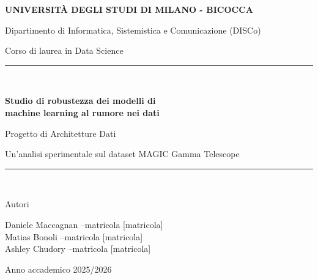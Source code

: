 \documentclass[12pt,a4paper]{article}
\begin{document}
\begin{titlepage}
	\centering
	\vspace*{0.6cm}
	{\Large\bfseries UNIVERSIT\`A DEGLI STUDI DI MILANO - BICOCCA\par}
	\vspace{0.4cm}
	{\large Dipartimento di Informatica, Sistemistica e Comunicazione (DISCo)\par}
	\vspace{0.2cm}
	{\large Corso di laurea in Data Science\par}
	\vspace{1.2cm}

	\rule{\textwidth}{0.4pt}\\[0.4cm]
	{\LARGE\bfseries Studio di robustezza dei modelli di\\ machine learning al rumore nei dati\par}
	\vspace{0.35cm}
	{\large Progetto di Architetture Dati\par}
	\vspace{0.25cm}
	{\normalsize Un'analisi sperimentale sul dataset MAGIC Gamma Telescope\par}
	\rule{\textwidth}{0.4pt}\\[1.4cm]

	\begin{minipage}{0.9\textwidth}
		\centering
		{\large Autori\par}
		\vspace{0.3cm}
		{\large
			Daniele Maccagnan \quad--\quad matricola [matricola]\\[0.25cm]
			Matias Bonoli \quad--\quad matricola [matricola]\\[0.25cm]
			Ashley Chudory \quad--\quad matricola [matricola]\\
		}
	\end{minipage}

	\vfill
	{\large Anno accademico 2025/2026\par}
\end{titlepage}

\tableofcontents
\thispagestyle{plain}
\clearpage

\end{document}
